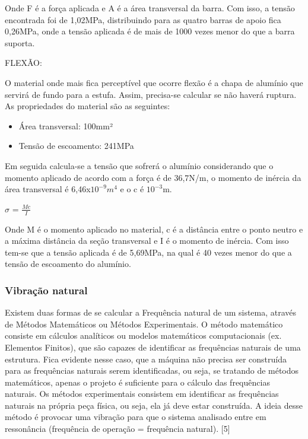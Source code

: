 Onde F é a força aplicada e A é a área transversal da barra. Com isso, a tensão encontrada foi de 1,02MPa,  distribuindo para as quatro barras de apoio fica 0,26MPa, onde a tensão aplicada é de mais de 1000 vezes menor do que a barra suporta. 

FLEXÃO:

O material onde mais fica perceptível que ocorre flexão é a chapa de alumínio que servirá de fundo para a estufa. Assim, precisa-se calcular se não haverá ruptura. As propriedades do material são as seguintes:

\begin{itemize}
	\item Área transversal: 100mm²
	\item Tensão de escoamento: 241MPa
\end{itemize}

Em seguida calcula-se a tensão que sofrerá o alumínio considerando que o momento aplicado de acordo com a força é de 36,7N/m, o momento de inércia da área transversal é 6,46x$10^{-9} m^4$ e o c é $10^{-3}$m.

$\sigma$ = $\frac{Mc}{I}$

Onde M é o momento aplicado no material, c é a distância entre o ponto neutro e a máxima distância da seção transversal e I é o momento de inércia. Com isso tem-se que a tensão aplicada é de 5,69MPa, na qual é 40 vezes menor do que a tensão de escoamento do alumínio.

\subsubsection{Vibração natural}

Existem duas formas de se calcular a Frequência natural de um sistema, através de Métodos Matemáticos ou Métodos Experimentais. O método matemático consiste em cálculos analíticos ou modelos matemáticos computacionais (ex. Elementos Finitos), que são capazes de identificar as frequências naturais de uma estrutura. Fica evidente nesse caso, que a máquina não precisa ser construída para as frequências naturais serem identificadas, ou seja, se tratando de métodos matemáticos, apenas o projeto é suficiente para o cálculo das frequências naturais. Os métodos experimentais consistem em identificar as frequências naturais na própria peça física, ou seja, ela já deve estar construída. A ideia desse método é provocar uma vibração para que o sistema analisado entre em ressonância (frequência de operação = frequência natural). [5]

